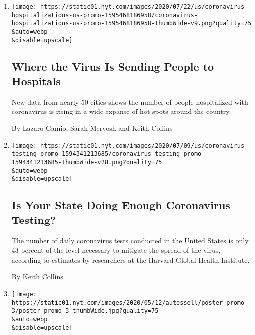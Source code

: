 \begin{enumerate}
\def\labelenumi{\arabic{enumi}.}
\item
  \href{/interactive/2020/07/23/us/coronavirus-hospitalizations-us.html}{}

  \texttt{[image: https://static01.nyt.com/images/2020/07/22/us/coronavirus-hospitalizations-us-promo-1595468186958/coronavirus-hospitalizations-us-promo-1595468186958-thumbWide-v9.png?quality=75\\\&auto=webp\\\&disable=upscale]}

  \hypertarget{where-the-virus-is-sending-people-to-hospitals}{%
  \subsection{Where the Virus Is Sending People to
  Hospitals}\label{where-the-virus-is-sending-people-to-hospitals}}

  New data from nearly 50 cities shows the number of people hospitalized
  with coronavirus is rising in a wide expanse of hot spots around the
  country.

  By Lazaro Gamio, Sarah Mervosh and Keith Collins
\item
  \href{/interactive/2020/us/coronavirus-testing.html}{}

  \texttt{[image: https://static01.nyt.com/images/2020/07/09/us/coronavirus-testing-promo-1594341213685/coronavirus-testing-promo-1594341213685-thumbWide-v28.png?quality=75\\\&auto=webp\\\&disable=upscale]}

  \hypertarget{is-your-state-doing-enough-coronavirus-testing}{%
  \subsection{Is Your State Doing Enough Coronavirus
  Testing?}\label{is-your-state-doing-enough-coronavirus-testing}}

  The number of daily coronavirus tests conducted in the United States
  is only 43 percent of the level necessary to mitigate the spread of
  the virus, according to estimates by researchers at the Harvard Global
  Health Institute.

  By Keith Collins
\item
  \href{/interactive/2020/05/12/us/coronavirus-testing-white-house.html}{}

  \texttt{[image: https://static01.nyt.com/images/2020/05/12/autossell/poster-promo-3/poster-promo-3-thumbWide.jpg?quality=75\\\&auto=webp\\\&disable=upscale]}

  \hypertarget{the-white-house-uses-this-device-for-virus-testing-some-results-might-be-false}{%
}
\end{enumerate}
